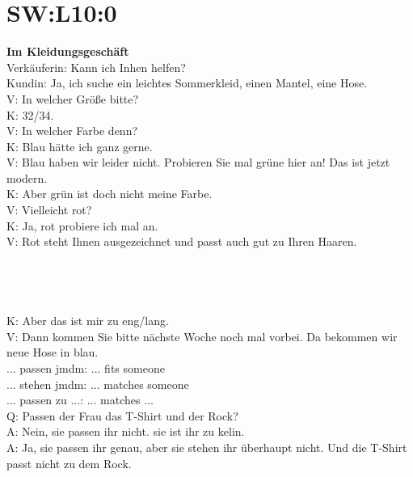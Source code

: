 \section{SW:L10:0}
\noindent
\textbf{Im Kleidungsgeschäft} \\
Verkäuferin: Kann ich Inhen helfen? \\
Kundin: Ja, ich suche ein leichtes Sommerkleid, einen Mantel, eine Hose. \\
V: In welcher Größe bitte?  \\
K: 32/34. \\
V: In welcher Farbe denn? \\
K: Blau hätte ich ganz gerne.  \\
V: Blau haben wir leider nicht. Probieren Sie mal grüne hier an! Das ist jetzt modern.  \\
K: Aber grün ist doch nicht meine Farbe. \\
V: Vielleicht rot? \\
K: Ja, rot probiere ich mal an. \\
V: Rot steht Ihnen ausgezeichnet und passt auch gut zu Ihren Haaren.  \\
\\
\\
\\
\\
\noindent
K: Aber das ist mir zu eng/lang.  \\
V: Dann kommen Sie bitte nächste Woche noch mal vorbei. Da bekommen wir neue Hose in blau. \\

... passen jmdm: ... fits someone \\
... stehen jmdm: ... matches someone \\
... passen zu ...: ... matches ... \\
Q: Passen der Frau das T-Shirt und der Rock? \\
A: Nein, sie passen ihr nicht. sie ist ihr zu kelin.  \\
A: Ja, sie passen ihr genau, aber sie stehen ihr überhaupt nicht. Und die T-Shirt passt nicht zu dem Rock. \\

